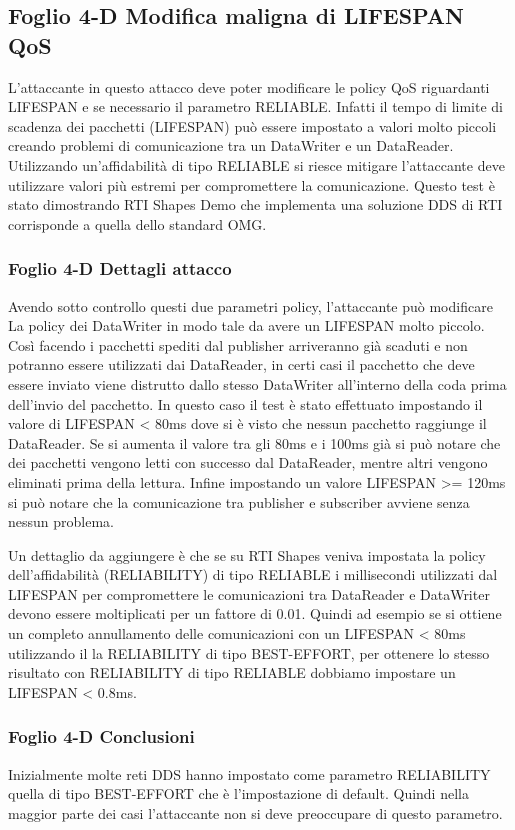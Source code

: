 \subsection{Foglio 4-D Modifica maligna di LIFESPAN QoS}
L'attaccante in questo attacco deve poter modificare le policy QoS riguardanti
LIFESPAN e se necessario il parametro RELIABLE.
Infatti il tempo di limite di scadenza dei pacchetti (LIFESPAN)
può essere impostato a valori molto piccoli creando problemi di comunicazione
tra un DataWriter e un DataReader. Utilizzando un'affidabilità di tipo RELIABLE
si riesce mitigare l'attaccante deve utilizzare valori più estremi per compromettere
la comunicazione. Questo test è stato dimostrando RTI Shapes Demo che implementa una
soluzione DDS di RTI corrisponde a quella dello standard OMG.


\subsubsection{Foglio 4-D Dettagli attacco}
Avendo sotto controllo questi due parametri policy, l'attaccante può modificare La
policy dei DataWriter in modo tale da avere un LIFESPAN molto piccolo. Così
facendo i pacchetti spediti dal publisher arriveranno già scaduti e non potranno
essere utilizzati dai DataReader, in certi casi il pacchetto che deve essere inviato
viene distrutto dallo stesso DataWriter all'interno della coda prima dell'invio
del pacchetto. In questo caso il test è stato effettuato impostando il valore di
LIFESPAN < 80ms dove si è visto che nessun pacchetto raggiunge il DataReader.
Se si aumenta il valore tra gli 80ms e i 100ms già si può notare che dei pacchetti
vengono letti con successo dal DataReader, mentre altri vengono eliminati prima
della lettura. Infine impostando un valore LIFESPAN >= 120ms si può notare che
la comunicazione tra publisher e subscriber avviene senza nessun problema.


Un dettaglio da aggiungere è che se su RTI Shapes veniva impostata la policy
dell'affidabilità (RELIABILITY) di tipo RELIABLE i millisecondi utilizzati
dal LIFESPAN per compromettere le comunicazioni tra DataReader e DataWriter
devono essere moltiplicati per un fattore di 0.01. Quindi ad esempio se si
ottiene un completo annullamento delle comunicazioni con un LIFESPAN < 80ms
utilizzando il la RELIABILITY di tipo BEST-EFFORT, per ottenere lo stesso
risultato con RELIABILITY di tipo RELIABLE dobbiamo impostare un
LIFESPAN < 0.8ms.


\subsubsection{Foglio 4-D Conclusioni}
Inizialmente molte reti DDS hanno impostato come parametro RELIABILITY quella
di tipo BEST-EFFORT che è l'impostazione di default. Quindi nella maggior parte
dei casi l'attaccante non si deve preoccupare di questo parametro.


